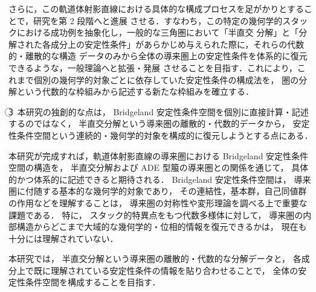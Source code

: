 \documentclass[11pt,a4paper]{ltjsarticle}
\newcommand{\研究課題名}{軌道体射影直線の導来圏の半直交分解とBridgeland安定性条件に関する研究}
\newcommand{\研究機関名}{大阪大学}
\newcommand{\研究代表者氏名}{山本 雄大}
\begin{document}
さらに，この軌道体射影直線における具体的な構成プロセスを足がかりとすることで，研究を第 2 段階へと進展
させる．すなわち，この特定の幾何学的スタックにおける成功例を抽象化し，一般的な三角圏において「半直交
分解」と「分解された各成分上の安定性条件」があらかじめ与えられた際に，それらの代数的・離散的な構造
データのみから全体の導来圏上の安定性条件を体系的に復元できるような，一般理論へと拡張・発展
させることを目指す．これにより，これまで個別の幾何学的対象ごとに依存していた安定性条件の構成法を，
圏の分解という代数的な枠組みから記述する新たな枠組みを確立する．

\begin{center}
\end{center}\vspace{3mm} 
\textcircled{3}\ 本研究の独創的な点は，
Bridgeland 安定性条件空間を個別に直接計算・記述するのではなく，
半直交分解という導来圏の離散的・代数的データから，
安定性条件空間という連続的・幾何学的対象を構成的に復元しようとする点にある．\par
本研究が完成すれば，軌道体射影直線の導来圏における Bridgeland 安定性条件空間の構造を，
半直交分解および ADE 型箙の導来圏との関係を通じて，
具体的かつ体系的に記述できると期待される．
Bridgeland 安定性条件空間は，
導来圏に付随する基本的な幾何学的対象であり，
その連結性，基本群，自己同値群の作用などを理解することは，
導来圏の対称性や変形理論を調べる上で重要な課題である．
特に，
スタック的特異点をもつ代数多様体に対して，
導来圏の内部構造からどこまで大域的な幾何学的・位相的情報を復元できるかは，
現在も十分には理解されていない．

本研究では，
半直交分解という導来圏の離散的・代数的な分解データと，
各成分上で既に理解されている安定性条件の情報を貼り合わせることで，
全体の安定性条件空間を構成することを目指す．
\end{document}
